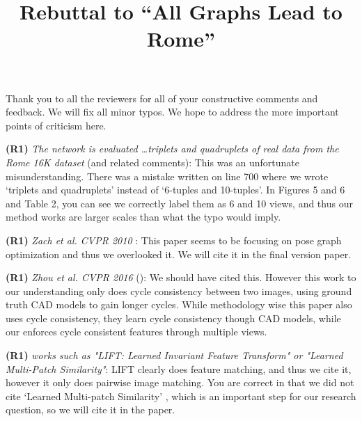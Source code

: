 \documentclass[10pt,twocolumn,letterpaper]{article}
\begin{document}
\title{Rebuttal to ``All Graphs Lead to Rome''}  %

\maketitle
\thispagestyle{empty}


Thank you to all the reviewers for all of your constructive comments and feedback.
We will fix all minor typos. 
We hope to address the more important points of criticism here.


\textbf{(R1)}
\textit{The network is evaluated \ldots triplets and quadruplets of real data from the Rome 16K dataset} (and related comments):
This was an unfortunate misunderstanding.
There was a mistake written on line 700 where we wrote `triplets and quadruplets' instead of `6-tuples and 10-tuples'.
In Figures 5 and 6 and Table 2, you can see we correctly label them as 6 and 10 views, and thus our method works are larger scales than what the typo would imply.

\textbf{(R1)} \textit{Zach et al. CVPR 2010} \cite{zach2010disambiguating}:
This paper seems to be focusing on pose graph optimization and thus we overlooked it.
We will cite it in the final version paper.

\textbf{(R1)} \textit{Zhou et al. CVPR 2016} (\cite{zhou2016learning}):
We should have cited this.
However this work \cite{zhou2016learning} to our understanding only does cycle consistency between two images, using ground truth CAD models to gain longer cycles.
While methodology wise this paper also uses cycle consistency, they learn cycle consistency though CAD models, while our enforces cycle consistent features through multiple views.

\textbf{(R1)} \textit{works such as "LIFT: Learned Invariant Feature Transform" or "Learned Multi-Patch Similarity"}:
LIFT \cite{yi2016lift} clearly does feature matching, and thus we cite it, however it only does pairwise image matching.
You are correct in that we did not cite `Learned Multi-patch Similarity' \cite{hartmann2017learned}, which is an important step for our research question, so we will cite it in the paper.
\end{document}
